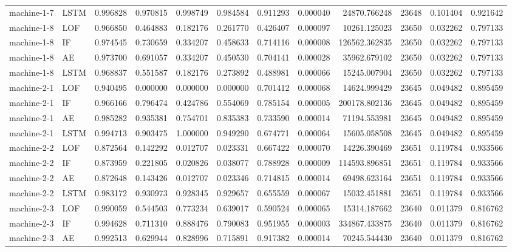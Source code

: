 \begin{longtable}{llrrrrrrrrrr}
machine-1-7 & LSTM & 0.996828 & 0.970815 & 0.998749 & 0.984584 & 0.911293 & 0.000040 & 24870.766248 & 23648 & 0.101404 & 0.921642 \\
machine-1-8 & LOF & 0.966850 & 0.464883 & 0.182176 & 0.261770 & 0.426407 & 0.000097 & 10261.125023 & 23650 & 0.032262 & 0.797133 \\
machine-1-8 & IF & 0.974545 & 0.730659 & 0.334207 & 0.458633 & 0.714116 & 0.000008 & 126562.362835 & 23650 & 0.032262 & 0.797133 \\
machine-1-8 & AE & 0.973700 & 0.691057 & 0.334207 & 0.450530 & 0.704141 & 0.000028 & 35962.679102 & 23650 & 0.032262 & 0.797133 \\
machine-1-8 & LSTM & 0.968837 & 0.551587 & 0.182176 & 0.273892 & 0.488981 & 0.000066 & 15245.007904 & 23650 & 0.032262 & 0.797133 \\
machine-2-1 & LOF & 0.940495 & 0.000000 & 0.000000 & 0.000000 & 0.701412 & 0.000068 & 14624.999429 & 23645 & 0.049482 & 0.895459 \\
machine-2-1 & IF & 0.966166 & 0.796474 & 0.424786 & 0.554069 & 0.785154 & 0.000005 & 200178.802136 & 23645 & 0.049482 & 0.895459 \\
machine-2-1 & AE & 0.985282 & 0.935381 & 0.754701 & 0.835383 & 0.733590 & 0.000014 & 71194.553981 & 23645 & 0.049482 & 0.895459 \\
machine-2-1 & LSTM & 0.994713 & 0.903475 & 1.000000 & 0.949290 & 0.674771 & 0.000064 & 15605.058508 & 23645 & 0.049482 & 0.895459 \\
machine-2-2 & LOF & 0.872564 & 0.142292 & 0.012707 & 0.023331 & 0.667422 & 0.000070 & 14226.390469 & 23651 & 0.119784 & 0.933566 \\
machine-2-2 & IF & 0.873959 & 0.221805 & 0.020826 & 0.038077 & 0.788928 & 0.000009 & 114593.896851 & 23651 & 0.119784 & 0.933566 \\
machine-2-2 & AE & 0.872648 & 0.143426 & 0.012707 & 0.023346 & 0.714815 & 0.000014 & 69498.623164 & 23651 & 0.119784 & 0.933566 \\
machine-2-2 & LSTM & 0.983172 & 0.930973 & 0.928345 & 0.929657 & 0.655559 & 0.000067 & 15032.451881 & 23651 & 0.119784 & 0.933566 \\
machine-2-3 & LOF & 0.990059 & 0.544503 & 0.773234 & 0.639017 & 0.590524 & 0.000065 & 15314.187662 & 23640 & 0.011379 & 0.816762 \\
machine-2-3 & IF & 0.994628 & 0.711310 & 0.888476 & 0.790083 & 0.951955 & 0.000003 & 334867.433875 & 23640 & 0.011379 & 0.816762 \\
machine-2-3 & AE & 0.992513 & 0.629944 & 0.828996 & 0.715891 & 0.917382 & 0.000014 & 70245.544430 & 23640 & 0.011379 & 0.816762 \\

\end{longtable}
